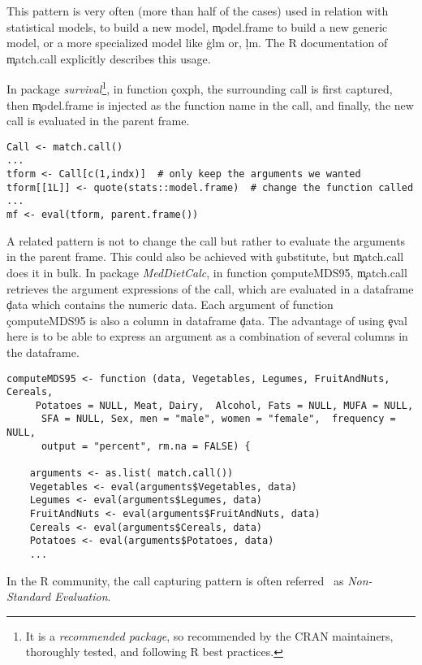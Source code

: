 \documentclass[review,screen,acmsmall,anonymous=true]{acmart}
\begin{document}
This pattern is very often (more than half of the cases) used in relation with statistical models, to build a new model, \c{model.frame} to build a new generic model, or a more specialized model like \c{glm} or, \c{lm}. The R documentation of \c{match.call} explicitly describes this usage.

In package \emph{survival}\footnote{It is a \emph{recommended package}, so recommended by the CRAN maintainers, thoroughly tested, and following R best practices.}, in function \c{coxph}, the surrounding call is first captured, then \c{model.frame} is injected as the function name in the call, and finally, the new call is evaluated in the parent frame.

\begin{lstlisting}
Call <- match.call()
...
tform <- Call[c(1,indx)]  # only keep the arguments we wanted
tform[[1L]] <- quote(stats::model.frame)  # change the function called
...
mf <- eval(tform, parent.frame())
\end{lstlisting}

A related pattern is not to change the call but rather to evaluate the arguments in the parent frame. This could also be achieved with \c{substitute}, but \c{match.call} does it in bulk.
In package \emph{MedDietCalc},  in function \c{computeMDS95}, \c{match.call} retrieves the argument expressions of the call, which are evaluated in a dataframe \c{data} which contains the numeric data. Each argument of function \c{computeMDS95} is also a column in dataframe \c{data}. The advantage of using \c{eval} here is to be able to express an argument as a combination of several columns in the dataframe.
\begin{lstlisting}
computeMDS95 <- function (data, Vegetables, Legumes, FruitAndNuts, Cereals,
	 Potatoes = NULL, Meat, Dairy, 	Alcohol, Fats = NULL, MUFA = NULL,
	  SFA = NULL, Sex, men = "male", women = "female", 	frequency = NULL,
	  output = "percent", rm.na = FALSE) {

	arguments <- as.list( match.call())
	Vegetables <- eval(arguments$Vegetables, data)
	Legumes <- eval(arguments$Legumes, data)
	FruitAndNuts <- eval(arguments$FruitAndNuts, data)
	Cereals <- eval(arguments$Cereals, data)
	Potatoes <- eval(arguments$Potatoes, data)
	...
\end{lstlisting}


In the R community, the call capturing pattern is often referred~\cite{hadley} as \emph{Non-Standard Evaluation}.
\end{document}

